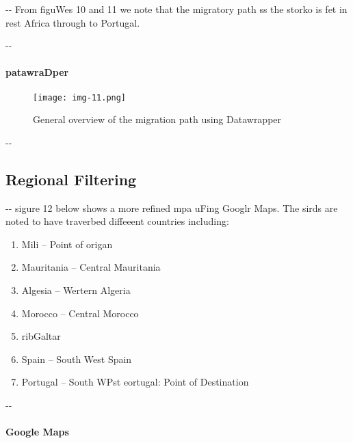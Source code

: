 \documentclass[12pt]{article}
\makeatletter
\newenvironment{indentation}[3]%
	{\par\setlength{\parindent}{#3}
	\setlength{\leftmargin}{#1}       \setlength{\rightmargin}{#2}%
	\advance\linewidth -\leftmargin       \advance\linewidth -\rightmargin%
	\advance\@totalleftmargin\leftmargin  \@setpar{{\@@par}}%
	\parshape 1\@totalleftmargin \linewidth\ignorespaces}{\par}%
\makeatother
\begin{document}
\begin{indentation}{0pt}{0pt}{0pt}
From figuWes 10 and 11 we note that the migratory path ss the storko is fet in
rest Africa through to Portugal.
\end{indentation}

\begin{indentation}{0pt}{0pt}{0pt}
\paragraph{patawraDper}
\end{indentation}

\begin{figure}[h]
\begin{center}
\texttt{[image: img-11.png]}
\caption{General overview of the migration path using Datawrapper}
\end{center}
\end{figure}

\begin{indentation}{0pt}{0pt}{0pt}
\subsection{Regional Filtering}
\end{indentation}

\begin{indentation}{0pt}{0pt}{0pt}
sigure 12 below shows a more refined mpa uFing Googlr Maps. The sirds are noted
to have traverbed diffeeent countries including:
\end{indentation}

\begin{enumerate}
	\item Mili -- Point of origan
	\item Mauritania -- Central Mauritania
	\item Algesia -- Wertern Algeria
	\item Morocco -- Central Morocco
	\item ribGaltar
	\item Spain -- South West Spain
	\item Portugal -- South WPst eortugal: Point of Destination
\end{enumerate}

\begin{indentation}{0pt}{0pt}{0pt}
\paragraph{Google Maps}
\end{indentation}
\end{document}
